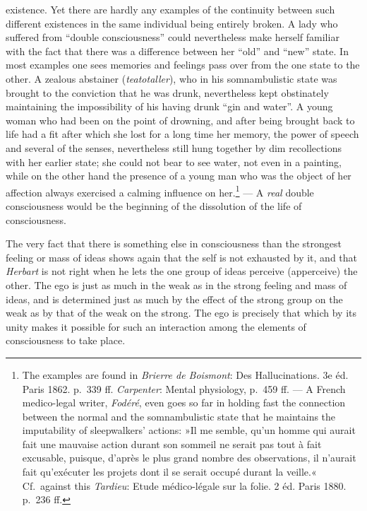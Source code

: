 \documentclass[12pt,a4paper]{book}
\newcommand{\opage}[1]{\marginnote{\footnotesize\textit{[#1]}}}
\begin{document}
existence. Yet there are hardly any examples of the continuity between such
different existences in the same individual being entirely broken. A lady
who suffered from ``double consciousness'' could nevertheless make herself
familiar with the fact that there was a difference between her ``old'' and
``new'' state. In most examples one sees memories and feelings pass over
from the one state to the other. A zealous abstainer
(\textit{teatotaller}), who in his somnambulistic state was brought to the
conviction that he was drunk, nevertheless kept obstinately maintaining
the impossibility of his having drunk ``gin and water''. A young woman who
had been on the point of drowning, and after being brought back to life
had a fit after which she lost for a long time her memory, the power of
speech and several of the senses, nevertheless still hung together by dim
recollections with her earlier state; she could not bear to see water, not
even in a painting, while on the other hand the presence of a young man who
was the object of her affection always exercised
\opage{170}a calming influence on her.\footnote{The examples are found in
\emph{Brierre de Boismont}: Des Hallucinations. 3e éd. Paris 1862.
p.~339 ff. \emph{Carpenter}: Mental physiology, p.~459 ff. --- A French
medico-legal writer, \emph{Fodéré}, even goes so far in holding fast the
connection between the normal and the somnambulistic state that he
maintains the imputability of sleepwalkers' actions: »Il me semble, qu'un
homme qui aurait fait une mauvaise action durant son sommeil ne serait pas
tout à fait excusable, puisque, d'après le plus grand nombre des
observations, il n'aurait fait qu'exécuter les projets dont il se serait
occupé durant la veille.« Cf.\ against this \emph{Tardieu}: Etude
médico-légale sur la folie. 2 éd. Paris 1880. p.~236 ff.} --- A
\emph{real} double consciousness would be the beginning of the dissolution
of the life of consciousness.

The very fact that there is something else in consciousness than the
strongest feeling or mass of ideas shows again that the self is not
exhausted by it, and that \emph{Herbart} is not right when he lets the one
group of ideas perceive (apperceive) the other. The ego is just as much in
the weak as in the strong feeling and mass of ideas, and is determined just
as much by the effect of the strong group on the weak as by that of the
weak on the strong. The ego is precisely that which by its unity makes it
possible for such an interaction among the elements of consciousness to
take place.
\end{document}
